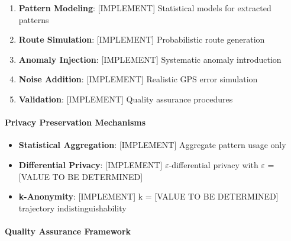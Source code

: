 \documentclass[runningheads]{llncs}
\begin{document}
\begin{enumerate}
\item \textbf{Pattern Modeling}: [IMPLEMENT] Statistical models for extracted patterns

\item \textbf{Route Simulation}: [IMPLEMENT] Probabilistic route generation

\item \textbf{Anomaly Injection}: [IMPLEMENT] Systematic anomaly introduction

\item \textbf{Noise Addition}: [IMPLEMENT] Realistic GPS error simulation

\item \textbf{Validation}: [IMPLEMENT] Quality assurance procedures
\end{enumerate}

\paragraph{Privacy Preservation Mechanisms}

\begin{itemize}
\item \textbf{Statistical Aggregation}: [IMPLEMENT] Aggregate pattern usage only
\item \textbf{Differential Privacy}: [IMPLEMENT] $\varepsilon$-differential privacy with $\varepsilon$ = [VALUE TO BE DETERMINED]
\item \textbf{k-Anonymity}: [IMPLEMENT] k = [VALUE TO BE DETERMINED] trajectory indistinguishability
\end{itemize}

\paragraph{Quality Assurance Framework}
\end{document}
